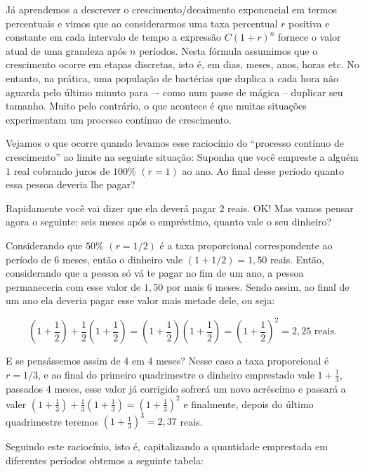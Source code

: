\begin{knowledge} {}

Já aprendemos a descrever o crescimento/decaimento exponencial em termos percentuais e vimos que ao considerarmos uma taxa percentual $r$ positiva e constante em cada intervalo de tempo a expressão $C(1+r)^{n}$ fornece o valor atual de uma grandeza após $n$ períodos. Nesta fórmula assumimos que o crescimento ocorre em etapas discretas, isto é, em dias, meses, anos, horas etc.
No entanto, na prática, uma população de bactérias que duplica a cada hora não aguarda pelo último minuto para –- como num passe de mágica  -- duplicar seu tamanho. Muito pelo contrário, o que acontece é que muitas situações experimentam um processo contínuo de crescimento.

Vejamos o que ocorre quando levamos esse raciocínio do “processo contínuo de crescimento” ao limite na seguinte situação: Suponha que você empreste a alguém $1$ real cobrando juros de $100\%$ $(r=1)$ ao ano. Ao final desse período quanto essa pessoa deveria lhe pagar?

Rapidamente você vai dizer que ela deverá pagar $2$ reais. OK! Mas vamos pensar agora o seguinte: seis meses após o empréstimo, quanto vale o seu dinheiro?

Considerando que $50\%$ $(r=1/2)$ é a taxa proporcional correspondente ao período de $6$ meses, então o dinheiro vale $(1+1/2)=1,50$ reais. Então, considerando que a pessoa só vá te pagar no fim de um ano, a pessoa permaneceria com esse valor de $1,50$ por mais $6$ meses. Sendo assim, ao final de um ano ela deveria pagar esse valor mais metade dele, ou seja:

\[
\left(1+\frac{1}{2}\right)+\frac{1}{2}\left(1+\frac{1}{2}\right)=\left(1+\frac{1}{2}\right)\left(1+\frac{1}{2}\right)=\left(1+\frac{1}{2}\right)^{2}= 2{,}25 \text{ reais}.
\]

E se pensássemos assim de 4 em 4 meses? Nesse caso a taxa proporcional é $r=1/3$, e ao final do primeiro quadrimestre o dinheiro emprestado vale $1+\frac13$, passados 4 meses, esse valor já corrigido sofrerá um novo acréscimo e passará a valer $\left(1+\frac13\right)+\frac13\left(1+\frac13\right)=\left(1+\frac13\right)^2$ e finalmente, depois do último quadrimestre teremos $\left(1+\frac13\right)^3 = 2{,}37$ reais.

Seguindo este raciocínio, isto é, capitalizando a quantidade emprestada em diferentes períodos obtemos a seguinte tabela:


\end{knowledge}
